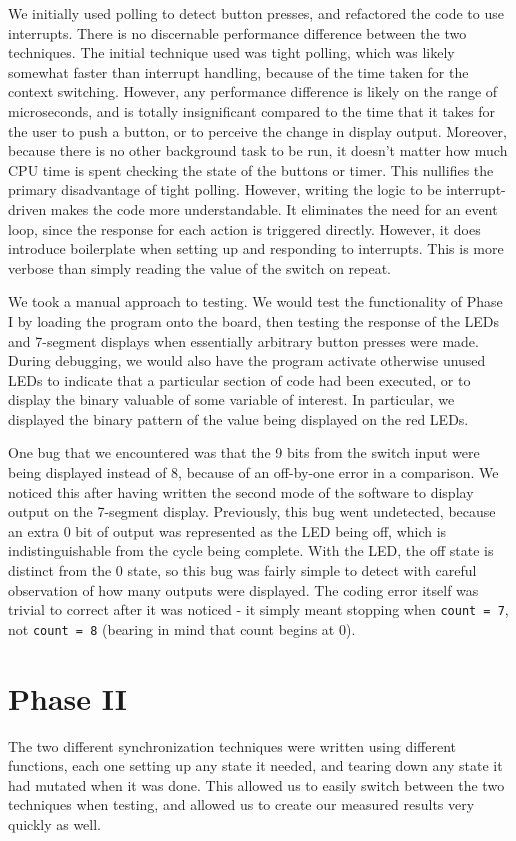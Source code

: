 \documentclass[12pt]{article}
\begin{document}
We initially used polling to detect button presses, and refactored the code
to use interrupts.
There is no discernable performance difference between the two techniques.
The initial technique used was tight polling, which was likely somewhat
faster than interrupt handling, because of the time taken for the context
switching.
However, any performance difference is likely on the range of microseconds,
and is totally insignificant compared to the time that it takes for the
user to push a button, or to perceive the change in display output.
Moreover, because there is no other background task to be run, it doesn't
matter how much CPU time is spent checking the state of the buttons or
timer.
This nullifies the primary disadvantage of tight polling.
However, writing the logic to be interrupt-driven makes the code more
understandable.
It eliminates the need for an event loop, since the response for each
action is triggered directly.
However, it does introduce boilerplate when setting up
and responding to interrupts.
This is more verbose than simply reading the value of the switch on repeat.

We took a manual approach to testing.
We would test the functionality of Phase I by loading the program onto the
board, then testing the response of the LEDs and 7-segment displays when
essentially arbitrary button presses were made.
During debugging, we would also have the program activate otherwise unused
LEDs to indicate that a particular section of code had been executed, or to
display the binary valuable of some variable of interest.
In particular, we displayed the binary pattern of the value being displayed
on the red LEDs.

One bug that we encountered was that the 9 bits from the switch input were
being displayed instead of 8, because of an off-by-one error in a comparison.
We noticed this after having written the second mode of the software to display
output on the 7-segment display.
Previously, this bug went undetected, because an extra 0 bit of output was
represented as the LED being off, which is indistinguishable from the cycle
being complete.
With the LED, the off state is distinct from the 0 state, so this bug was
fairly simple to detect with careful observation of how many outputs
were displayed.
The coding error itself was trivial to correct after it was noticed - it
simply meant stopping when \texttt{count = 7}, not \texttt{count = 8}
(bearing in mind that count begins at 0).

\newpage
\section{Phase II}
The two different synchronization techniques were written using different
functions, each one setting up any state it needed, and tearing down any
state it had mutated when it was done. This allowed us to easily switch
between the two techniques when testing, and allowed us to create our
measured results very quickly as well.
\end{document}
